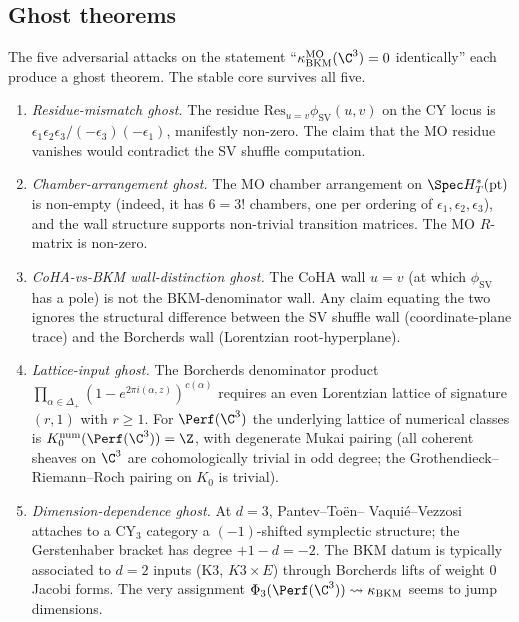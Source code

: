 \subsection*{Ghost theorems}

The five adversarial attacks on the statement
``$\kappa_{\mathrm{BKM}}^{\mathrm{MO}}(\C^3) = 0$ identically'' each
produce a ghost theorem. The stable core survives all five.

\begin{enumerate}[label=\textup{(G\arabic*)}]
 \item \emph{Residue-mismatch ghost.} The residue
 $\mathrm{Res}_{u = v} \phi_{\mathrm{SV}}(u, v)$ on the CY locus is
 $\epsilon_1 \epsilon_2 \epsilon_3 / (-\epsilon_3)(-\epsilon_1)$,
 manifestly non-zero. The claim that the MO residue vanishes would
 contradict the SV shuffle computation.
 \item \emph{Chamber-arrangement ghost.} The MO chamber arrangement
 on $\Spec H^*_T(\mathrm{pt})$ is non-empty (indeed, it has $6 = 3!$
 chambers, one per ordering of $\epsilon_1, \epsilon_2, \epsilon_3$),
 and the wall structure supports non-trivial transition matrices.
 The MO $R$-matrix is non-zero.
 \item \emph{CoHA-vs-BKM wall-distinction ghost.} The CoHA wall
 $u = v$ (at which $\phi_{\mathrm{SV}}$ has a pole) is not the
 BKM-denominator wall. Any claim equating the two ignores the
 structural difference between the SV shuffle wall (coordinate-plane
 trace) and the Borcherds wall (Lorentzian root-hyperplane).
 \item \emph{Lattice-input ghost.} The Borcherds denominator product
 $\prod_{\alpha \in \Delta_+}(1 - e^{2\pi i (\alpha, z)})^{c(\alpha)}$
 requires an even Lorentzian lattice of signature $(r, 1)$ with $r
 \geq 1$. For $\Perf(\C^3)$ the underlying lattice of numerical
 classes is $K_0^{\mathrm{num}}(\Perf(\C^3)) = \Z$, with degenerate
 Mukai pairing (all coherent sheaves on $\C^3$ are cohomologically
 trivial in odd degree; the Grothendieck--Riemann--Roch pairing on
 $K_0$ is trivial).
 \item \emph{Dimension-dependence ghost.} At $d = 3$, Pantev--To\"en--
 Vaqui\'e--Vezzosi attaches to a CY$_3$ category a $(-1)$-shifted
 symplectic structure; the Gerstenhaber bracket has degree
 $+1 - d = -2$. The BKM datum is typically associated to $d = 2$
 inputs (K3, $K3 \times E$) through Borcherds lifts of weight $0$
 Jacobi forms. The very assignment
 $\Phi_3(\Perf(\C^3)) \leadsto \kappa_{\mathrm{BKM}}$ seems to jump
 dimensions.
\end{enumerate}

